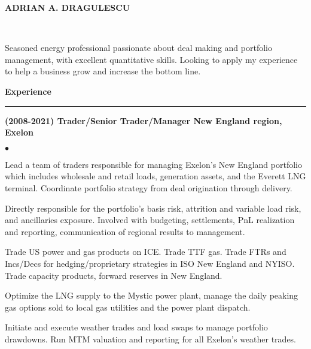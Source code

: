 \documentclass[11pt]{article}
\begin{document}
\vspace*{-35px}
\begin{center}
   \Large {\bf{ADRIAN A. DRAGULESCU}}
\end{center}

\noindent
{}\\

\vspace*{6pt}
\noindent
Seasoned energy professional passionate about deal making and
portfolio management, with excellent quantitative skills.  Looking to
apply my experience to help a business grow and increase the bottom line.

\vspace*{6pt}
\noindent
\large\textsf{\textbf {Experience}}

\vspace*{-8pt}
\noindent
\rule{165mm}{0.25mm}
\normalfont\normalsize

\noindent
{\bf (2008-2021) Trader/Senior Trader/Manager New England region, Exelon} 
\begin{list}{$\bullet$}
   {\setlength{\itemsep}{0ex} \setlength{\parsep}{1ex}}
   
  \item Lead a team of traders responsible for managing Exelon's New
    England portfolio which includes wholesale and retail loads,
    generation assets, and the Everett LNG terminal.  Coordinate
    portfolio strategy from deal origination through delivery.

  \item Directly responsible for the portfolio's basis risk, attrition
    and variable load risk, and ancillaries exposure.  Involved with
    budgeting, settlements, PnL realization and reporting,
    communication of regional results to management.

  \item Trade US power and gas products on ICE.  Trade TTF gas.  Trade
    FTRs and Incs/Decs for hedging/proprietary strategies in ISO New
    England and NYISO.  Trade capacity products, forward reserves in
    New England.
    
  \item Optimize the LNG supply to the Mystic power plant, manage the
    daily peaking gas options sold to local gas utilities and the
    power plant dispatch.

  \item Initiate and execute weather trades and load swaps to manage
    portfolio drawdowns.  Run MTM valuation and reporting for all
    Exelon's weather trades.

\end{list}
\end{document}
